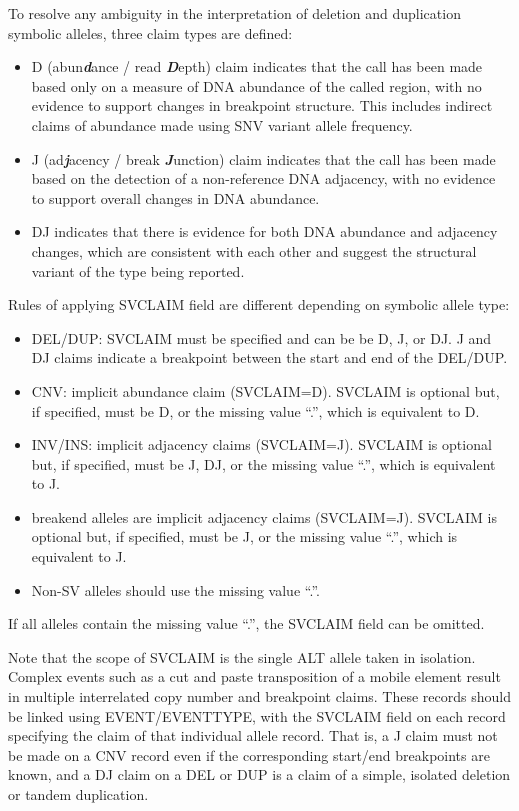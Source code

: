 \documentclass[8pt]{article}
\begin{document}
To resolve any ambiguity in the interpretation of deletion and duplication symbolic alleles, three claim types are defined:

\begin{itemize}
  \item D (abun\textbf{\emph{d}}ance / read \textbf{\emph{D}}epth) claim indicates that the call has been made based only on a measure of DNA abundance of the called region, with no evidence to support changes in breakpoint structure. This includes indirect claims of abundance made using SNV variant allele frequency.
  \item J (ad\textbf{\emph{j}}acency / break \textbf{\emph{J}}unction) claim indicates that the call has been made based on the detection of a non-reference DNA adjacency, with no evidence to support overall changes in DNA abundance.
  \item DJ indicates that there is evidence for both DNA abundance and adjacency changes, which are consistent with each other and suggest the structural variant of the type being reported.
\end{itemize}

Rules of applying SVCLAIM field are different depending on symbolic allele type:

\begin{itemize}
  \item DEL/DUP: SVCLAIM must be specified and can be be D, J, or DJ. J and DJ claims indicate a breakpoint between the start and end of the DEL/DUP.
  \item CNV: implicit abundance claim (SVCLAIM=D). SVCLAIM is optional but, if specified, must be D, or the missing value ``.'', which is equivalent to D.
  \item INV/INS: implicit adjacency claims (SVCLAIM=J). SVCLAIM is optional but, if specified, must be J, DJ, or the missing value ``.'', which is equivalent to J.
  \item breakend alleles are implicit adjacency claims (SVCLAIM=J). SVCLAIM is optional but, if specified, must be J, or the missing value ``.'', which is equivalent to J.
  \item Non-SV alleles should use the missing value ``.''.
\end{itemize}

If all alleles contain the missing value ``.'', the SVCLAIM field can be omitted.

Note that the scope of SVCLAIM is the single ALT allele taken in isolation.
Complex events such as a cut and paste transposition of a mobile element result in multiple interrelated copy number and breakpoint claims.
These records should be linked using EVENT/EVENTTYPE, with the SVCLAIM field on each record specifying the claim of that individual allele record.
That is, a J claim must not be made on a CNV record even if the corresponding start/end breakpoints are known, and a DJ claim on a DEL or DUP is a claim of a simple, isolated deletion or tandem duplication.
\end{document}
